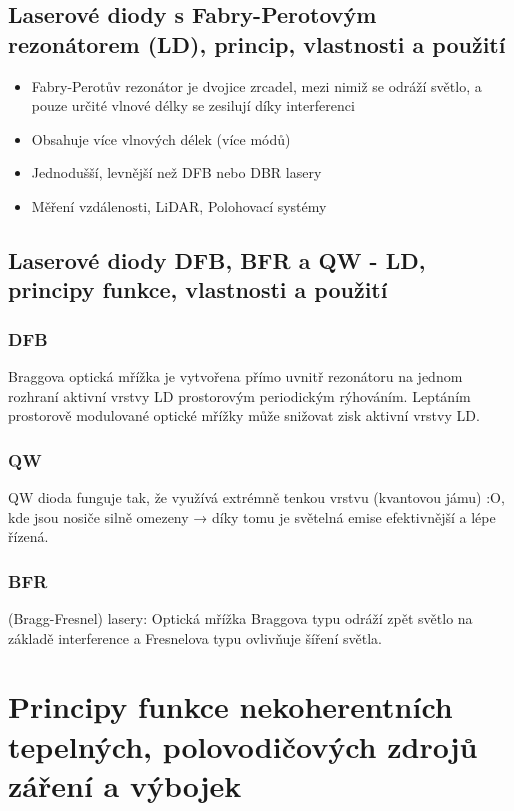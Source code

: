 \documentclass[a4paper, 12pt]{article}
\begin{document}
        \subsection{Laserové diody s Fabry-Perotovým rezonátorem (LD), princip, vlastnosti a použití}
            \begin{itemize}
                \item Fabry-Perotův rezonátor je dvojice zrcadel, mezi nimiž se odráží světlo, a pouze určité vlnové délky se zesilují díky interferenci
                \item Obsahuje více vlnových délek (více módů)
                \item Jednodušší, levnější než DFB nebo DBR lasery
                \item Měření vzdálenosti, LiDAR, Polohovací systémy
            \end{itemize}
        \subsection{Laserové diody DFB, BFR a QW - LD, principy funkce, vlastnosti a použití}
            \subsubsection{DFB}
                Braggova optická mřížka je vytvořena přímo uvnitř rezonátoru na jednom
                rozhraní aktivní vrstvy LD prostorovým periodickým rýhováním. Leptáním
                prostorově modulované optické mřížky může snižovat zisk aktivní vrstvy LD.

            \subsubsection{QW}
                QW dioda funguje tak, že využívá extrémně tenkou vrstvu (kvantovou jámu)
                :O, kde jsou nosiče silně omezeny → díky tomu je světelná emise efektivnější
                a lépe řízená.

            \subsubsection{BFR}
                (Bragg-Fresnel) lasery: Optická mřížka Braggova typu odráží zpět světlo na
                základě interference a Fresnelova typu ovlivňuje šíření světla.

    \section{Principy funkce nekoherentních tepelných, polovodičových zdrojů záření a výbojek}
\end{document}
